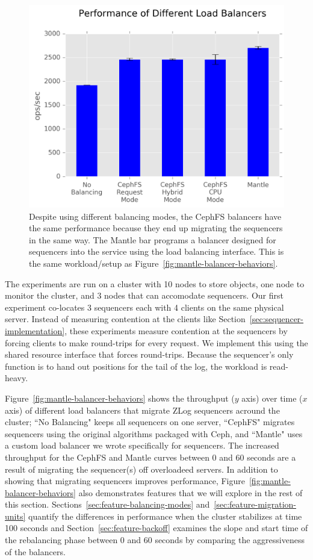 \documentclass[preprint]{sigplanconf-eurosys}
\begin{document}
\begin{figure}[t!]
\centering
\includegraphics{figures/mantle-balancer-performance.png}
\caption{Despite using different balancing modes, the CephFS balancers have the
same performance because they end up migrating the sequencers in the same way.
The Mantle bar programs a balancer designed for sequencers into the service
using the load balancing interface. This is the same workload/setup as
Figure~\ref{fig:mantle-balancer-behaviors}.}\label{fig:mantle-balancer-performance}
\end{figure}

The experiments are run on a cluster with 10 nodes to store objects, one node
to monitor the cluster, and 3 nodes that can accomodate sequencers. Our first
experiment co-locates 3 sequencers each with 4 clients on the same physical
server.  Instead of measuring contention at the clients like
Section~\ref{sec:sequencer-implementation}, these experiments measure
contention at the sequencers by forcing clients to make round-trips for every
request. We implement this using the shared resource interface that forces
round-trips.  Because the sequencer's only function is to  hand out positions
for the tail of the log, the workload is read-heavy.

Figure~\ref{fig:mantle-balancer-behaviors} shows the throughput (\(y\) axis)
over time (\(x\) axis) of different load balancers that migrate ZLog sequencers
acround the cluster; ``No Balancing" keeps all sequencers on one server,
``CephFS" migrates sequencers using the original algorithms packaged with Ceph,
and ``Mantle" uses a custom load balancer we wrote specifically for
sequencers. The increased throughput for the CephFS and Mantle curves between 0
and 60 seconds are a result of migrating the sequencer(s) off overloadeed
servers. In addition to showing that migrating sequencers improves performance,
Figure~\ref{fig:mantle-balancer-behaviors} also demonstrates features that we
will explore in the rest of this section.
Sections~\ref{sec:feature-balancing-modes}
and~\ref{sec:feature-migration-units} quantify the differences in performance
when the cluster stabilizes at time 100 seconds and
Section~\ref{sec:feature-backoff} examines the slope and start time of the
rebalancing phase between 0 and 60 seconds by comparing the aggressiveness of
the balancers.
\end{document}
